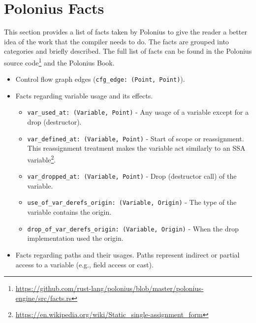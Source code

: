 \documentclass[
  11pt,
  twoside,symmetric]{report}
\providecommand{\tightlist}{%
  \setlength{\itemsep}{0pt}\setlength{\parskip}{0pt}}
\DeclareRobustCommand{\href}[2]{#2\footnote{\url{#1}}}
\begin{document}
\section{Polonius Facts}\label{polonius-facts}

This section provides a list of facts taken by Polonius to give the
reader a better idea of the work that the compiler needs to do. The
facts are grouped into categories and briefly described. The full list
of facts can be found in the
\href{https://github.com/rust-lang/polonius/blob/master/polonius-engine/src/facts.rs}{Polonius
source code} and the Polonius Book.

\begin{itemize}
\tightlist
\item
  Control flow graph edges (\texttt{cfg\_edge:\ (Point,\ Point)}).
\item
  Facts regarding variable usage and its effects.

  \begin{itemize}
  \tightlist
  \item
    \texttt{var\_used\_at:\ (Variable,\ Point)} - Any usage of a
    variable except for a drop (destructor).
  \item
    \texttt{var\_defined\_at:\ (Variable,\ Point)} - Start of scope or
    reassignment. This reassignment treatment makes the variable act
    similarly to an
    \href{https://en.wikipedia.org/wiki/Static_single-assignment_form}{SSA
    variable}.
  \item
    \texttt{var\_dropped\_at:\ (Variable,\ Point)} - Drop (destructor
    call) of the variable.
  \item
    \texttt{use\_of\_var\_derefs\_origin:\ (Variable,\ Origin)} - The
    type of the variable contains the origin.
  \item
    \texttt{drop\_of\_var\_derefs\_origin:\ (Variable,\ Origin)} - When
    the drop implementation used the origin.
  \end{itemize}
\item
  Facts regarding paths and their usages. Paths represent indirect or
  partial access to a variable (e.g., field access or cast).


\end{itemize}
\end{document}
